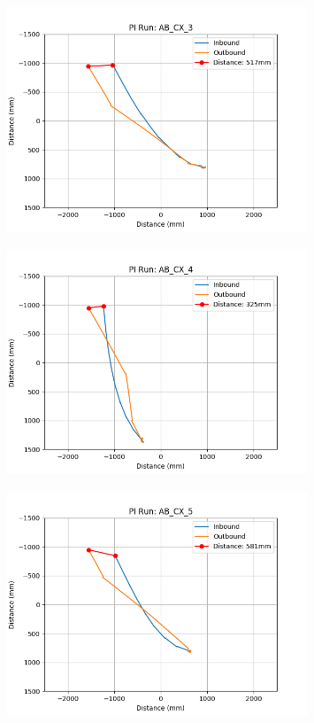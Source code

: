 \documentclass[a4paper,11pt,twoside,openright]{article}
\begin{document}
\begin{figure}[h!]
  \centering
  \includegraphics[width=0.8\textwidth]{AB_CX_3}
  \caption{\label{fig:abcx3}}
\end{figure}

\begin{figure}[h!]
  \centering
  \includegraphics[width=0.8\textwidth]{AB_CX_4}
  \caption{\label{fig:abcx4}}
\end{figure}

\begin{figure}[h!]
  \centering
  \includegraphics[width=0.8\textwidth]{AB_CX_5}
  \caption{\label{fig:abcx5}}
\end{figure}
\end{document}
